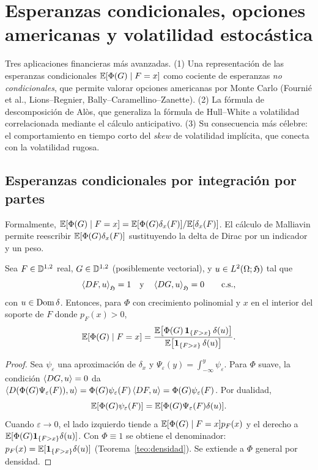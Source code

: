 \chapter{Esperanzas condicionales, opciones americanas y volatilidad estocástica}\label{cap:esperanzas-condicionales}

\begin{panorama}
Tres aplicaciones financieras más avanzadas. (1) Una representación de las esperanzas
condicionales $\mathbb{E}[\Phi(G)\mid F=x]$ como cociente de esperanzas \emph{no condicionales}, que permite
valorar opciones americanas por Monte Carlo (Fournié et al., Lions--Regnier, Bally--Caramellino--Zanette).
(2) La fórmula de descomposición de Alòs, que generaliza la
fórmula de Hull--White a volatilidad correlacionada mediante el cálculo anticipativo. (3)
Su consecuencia más célebre: el comportamiento en tiempo corto del \emph{skew} de volatilidad
implícita, que conecta con la volatilidad rugosa.
\end{panorama}

\section{Esperanzas condicionales por integración por partes}
Formalmente, $\mathbb{E}[\Phi(G)\mid F=x]=\mathbb{E}[\Phi(G)\delta_x(F)]/\mathbb{E}[\delta_x(F)]$. El cálculo de Malliavin permite
reescribir $\mathbb{E}[\Phi(G)\delta_x(F)]$ sustituyendo la delta de Dirac por un indicador y un peso.

\begin{teorema}\label{teo:esp-cond-malliavin}
Sea $F\in\mathbb{D}^{1,2}$ real, $G\in\mathbb{D}^{1,2}$ (posiblemente vectorial), y $u\in L^2(\Omega;\mathfrak{H})$ tal que
\[
  \left\langle DF, u\right\rangle_{\mathfrak{H}}=1\quad\text{y}\quad\left\langle DG, u\right\rangle_{\mathfrak{H}}=0\qquad\text{c.s.},
\]
con $u\in\operatorname{Dom}\delta$. Entonces, para $\Phi$ con crecimiento polinomial y $x$ en el interior del soporte
de $F$ donde $p_F(x)>0$,
\[
  \mathbb{E}[\Phi(G)\mid F=x]=\frac{\mathbb{E}\big[\Phi(G)\,\mathbf{1}_{\{F>x\}}\,\delta(u)\big]}{\mathbb{E}\big[\mathbf{1}_{\{F>x\}}\,\delta(u)\big]}.
\]
\end{teorema}

\begin{proof}
Sea $\psi_\varepsilon$ una aproximación de $\delta_x$ y $\Psi_\varepsilon(y)=\int_{-\infty}^y\psi_\varepsilon$. Para $\Phi$ suave, la condición
$\left\langle DG, u\right\rangle=0$ da $\left\langle D(\Phi(G)\Psi_\varepsilon(F)), u\right\rangle=\Phi(G)\psi_\varepsilon(F)\left\langle DF, u\right\rangle=\Phi(G)\psi_\varepsilon(F)$. Por dualidad,
\[
  \mathbb{E}[\Phi(G)\psi_\varepsilon(F)]=\mathbb{E}[\Phi(G)\Psi_\varepsilon(F)\delta(u)].
\]
Cuando $\varepsilon\to0$, el lado izquierdo tiende a $\mathbb{E}[\Phi(G)\mid F=x]p_F(x)$ y el derecho a
$\mathbb{E}[\Phi(G)\mathbf{1}_{\{F>x\}}\delta(u)]$. Con $\Phi\equiv1$ se obtiene el denominador: $p_F(x)=\mathbb{E}[\mathbf{1}_{\{F>x\}}\delta(u)]$
(Teorema~\ref{teo:densidad}). Se extiende a $\Phi$ general por densidad.
\end{proof}

